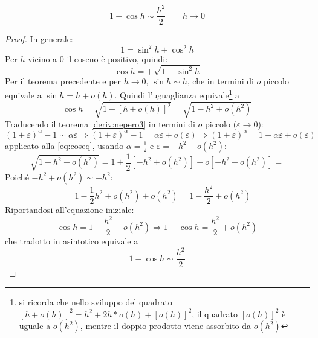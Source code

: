 \begin{teor}
	\label{deriv:cos}
	\[
		1-\cos h\sim \frac{h^2}{2}\qquad h\to0
	\]
\end{teor}
\begin{proof}
	In generale:
	\[
		1=\sin^2 h+\cos^2 h
	\]
	Per $h$ vicino a $0$ il coseno è positivo, quindi:
	\[
		\cos h=+\sqrt{1-\sin^2 h}
	\]
	Per il teorema precedente e per $h\to0$, $\sin h\sim h$, che in termini di $o$ piccolo equivale a $\sin h=h+o(h)$. Quindi l'uguaglianza equivale\footnote{si ricorda che nello sviluppo del quadrato $[h+o(h)]^2=h^2+2h*o(h)+[o(h)]^2$, il quadrato $[o(h)]^2$ è uguale a $o(h^2)$, mentre il doppio prodotto viene assorbito da $o(h^2)$} a
	\begin{equation}
		\label{eq:coseq}
		\cos h=\sqrt{1-[h+o(h)]^2}=\sqrt{1-h^2+o(h^2)}
	\end{equation}
	Traducendo il teorema \ref{deriv:nepero3} in termini di $o$ piccolo ($\varepsilon\to0$):
	\[
		(1+\varepsilon)^\alpha-1\sim\alpha\varepsilon\Rightarrow (1+\varepsilon)^\alpha-1=\alpha\varepsilon+o(\varepsilon)\Rightarrow (1+\varepsilon)^\alpha=1+\alpha\varepsilon+o(\varepsilon)
	\]
	applicato alla \ref{eq:coseq}, usando $\alpha=\frac{1}{2}$ e $\varepsilon=-h^2+o(h^2)$:
	\[
		\sqrt{1-h^2+o(h^2)}=1+\frac{1}{2}[-h^2+o(h^2)]+o[-h^2+o(h^2)]=
	\]
	Poiché $-h^2+o(h^2)\sim -h^2$:
	\[
		=1-\frac{1}{2}h^2+o(h^2)+o(h^2)=1-\frac{h^2}{2}+o(h^2)
	\]
	Riportandosi all'equazione iniziale:
	\[
		\cos h=1-\frac{h^2}{2}+o(h^2)\Rightarrow 1-\cos h=\frac{h^2}{2}+o(h^2)
	\]
	che tradotto in asintotico equivale a
	\[
		1-\cos h\sim\frac{h^2}{2}
	\]
\end{proof}

